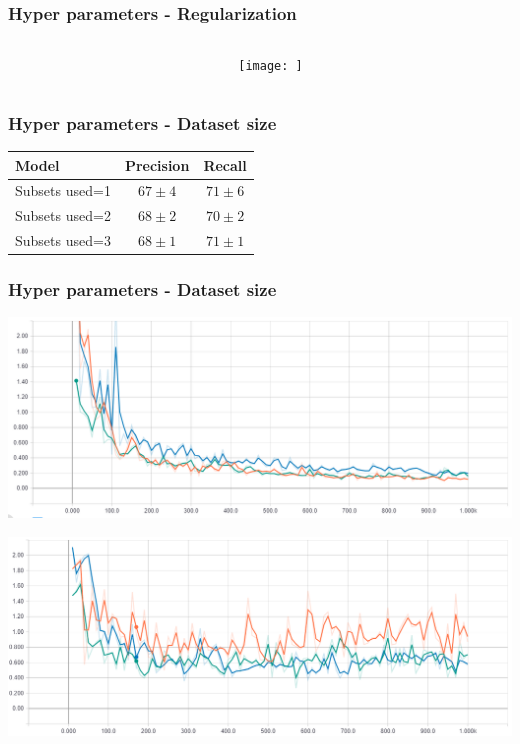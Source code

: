 \documentclass{beamer}
\begin{document}
\begin{frame}
\frametitle{Hyper parameters - Regularization}
\begin{columns}
	\begin{column}{0.5\textwidth}

	\end{column}
	\begin{column}{0.5\textwidth}
		\begin{center}
			\texttt{[image: ]}
		\end{center}
	\end{column}
\end{columns}
\end{frame}

\begin{frame}
\frametitle{Hyper parameters - Dataset size}
\begin{tabular}{l|c|c}
	Model & Precision & Recall \\ \hline
	Subsets used=1 & $67 \pm 4$ & $71 \pm 6$ \\
	Subsets used=2 & $68 \pm 2$ & $70 \pm 2$ \\
	Subsets used=3 & $68 \pm 1$ & $71 \pm 1$ \\
\end{tabular}
\end{frame}

\begin{frame}
\frametitle{Hyper parameters - Dataset size}
\centering
\includegraphics[width=\textwidth]{dataset_size_train.png}

\includegraphics[width=\textwidth]{dataset_size_validation.png}
\end{frame}
\end{document}
